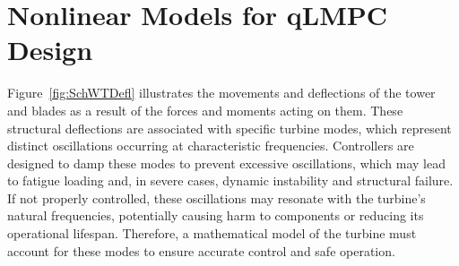 \section{Nonlinear Models for qLMPC Design} \label{sec:MechanicalAerodynamicSubsystemModel}
Figure~\ref{fig:SchWTDefl} illustrates the movements and deflections of the tower and blades as a result of the forces and moments acting on them.
These structural deflections are associated with specific turbine modes, which represent distinct oscillations occurring at characteristic frequencies. Controllers are designed to damp these modes to prevent excessive oscillations, which may lead to fatigue loading and, in severe cases, dynamic instability and structural failure. If not properly controlled, these oscillations may resonate with the turbine’s natural frequencies, potentially causing harm to components or reducing its operational lifespan. Therefore, a mathematical model of the turbine must account for these modes to ensure accurate control and safe operation. 


